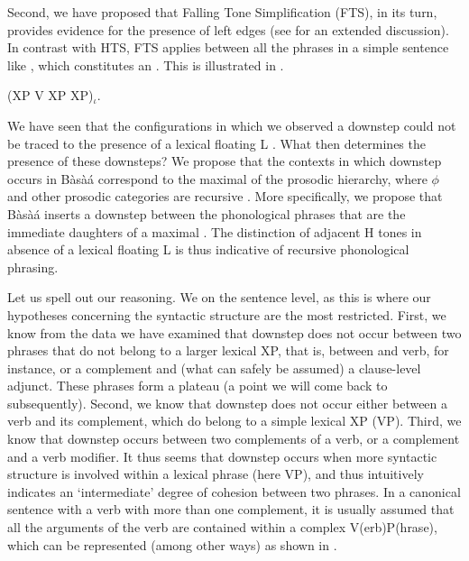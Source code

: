 \documentclass[output=paper,newtxmath,modfonts,nonflat,hidelinks]{langsci/langscibook}
\begin{document}
Second, we have proposed that Falling Tone Simplification (FTS), in its turn, provides e\-vi\-dence for the presence of  left edges (see \citet{HamlaouiSzendroi16} for an extended discussion). In contrast with HTS, FTS applies between all the phrases in a simple sentence like , which constitutes an . This is illustrated in .

\ea (XP V XP XP)$_{\iota}$.\label{ex:HamlaouiMakasso:22}
\z

We have seen that the configurations in which we observed a downstep could not be traced to the presence of a lexical floating L . What then determines the presence of these downsteps? We propose that the contexts in which downstep occurs in Bàsà{á} correspond to the maximal  of the pro\-sod\-ic hierarchy, where $\phi$ and other prosodic categories are recursive \citep[a.o.][]{ItoMester12}. More specifically, we propose that Bàsà{á} inserts a downstep between the phonological phrases that are the immediate daughters of a maximal . The distinction of adjacent H tones in absence of a lexical floating L is thus indicative of recursive phonological phrasing.

\largerpage
Let us spell out our reasoning. We  on the sentence level, as this is where our hypotheses concerning the syntactic structure are the most restricted. First, we know from the data we have examined that downstep does not occur between two phrases that do not belong to a larger lexical XP, that is, between  and verb, for instance, or a complement and (what can safely be assumed) a clause-level adjunct. These phrases form a plateau (a point we will come back to subsequently). Second, we know that downstep does not occur either between a verb and its complement, which do belong to a simple lexical XP (VP). Third, we know that downstep occurs between two complements of a verb, or a complement and a verb modifier. It thus seems that downstep occurs when more syntactic structure is involved within a lexical phrase (here VP), and thus intuitively indicates an `intermediate' degree of cohesion between two phrases. In a canonical sentence with a verb with more than one complement, it is usually assumed that all the arguments of the verb are contained within a complex V(erb)P(hrase), which can be represented (among other ways) as shown in  \citep{Larson88}.
\end{document}
